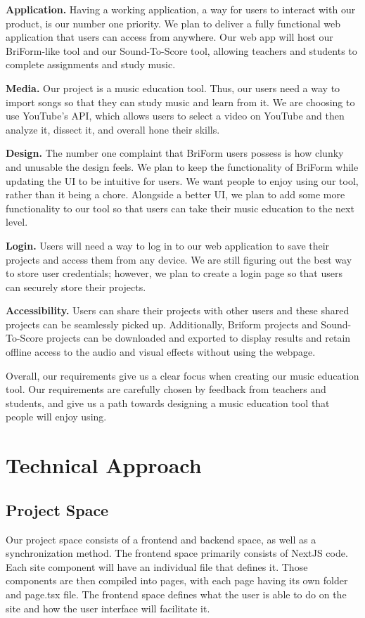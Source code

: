 \documentclass[12pt, letterpaper]{article}
\begin{document}
\textbf{Application.} Having a working application, a way for users to interact with our product, is our number one priority. We plan to deliver a fully functional web application that users can access from anywhere. Our web app will host our BriForm-like tool and our Sound-To-Score tool, allowing teachers and students to complete assignments and study music.

\textbf{Media.} Our project is a music education tool. Thus, our users need a way to import songs so that they can study music and learn from it. We are choosing to use YouTube's API, which allows users to select a video on YouTube and then analyze it, dissect it, and overall hone their skills.

\textbf{Design.} The number one complaint that BriForm users possess is how clunky and unusable the design feels. We plan to keep the functionality of BriForm while updating the UI to be intuitive for users. We want people to enjoy using our tool, rather than it being a chore. Alongside a better UI, we plan to add some more functionality to our tool so that users can take their music education to the next level.

\textbf{Login.} Users will need a way to log in to our web application to save their projects and access them from any device. We are still figuring out the best way to store user credentials; however, we plan to create a login page so that users can securely store their projects.

\textbf{Accessibility.} Users can share their projects with other users and these shared projects can be seamlessly picked up. Additionally, Briform projects and Sound-To-Score projects can be downloaded and exported to display results and retain offline access to the audio and visual effects without using the webpage. 

Overall, our requirements give us a clear focus when creating our music education tool. Our requirements are carefully chosen by feedback from teachers and students, and give us a path towards designing a music education tool that people will enjoy using.

\section*{Technical Approach}
\subsection*{Project Space}
Our project space consists of a frontend and backend space, as well as a synchronization method. The frontend space primarily consists of NextJS code. Each site component will have an individual file that defines it. Those components are then compiled into pages, with each page having its own folder and page.tsx file. The frontend space defines what the user is able to do on the site and how the user interface will facilitate it. 
\end{document}
